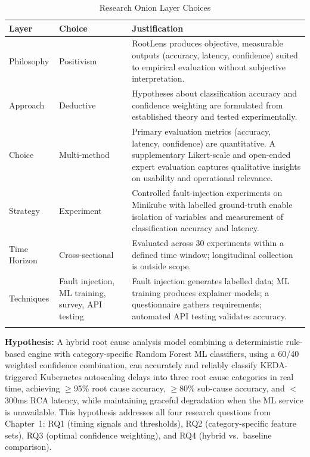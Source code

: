 \begin{xltabular}{\textwidth}{|p{2.5cm}|p{3.3cm}|X|}

\hline
\textbf{Layer} & \textbf{Choice} & \textbf{Justification} \\ \hline
\endfirsthead

Philosophy & Positivism & RootLens produces objective, measurable outputs (accuracy, latency, confidence) suited to empirical evaluation without subjective interpretation. \\ \hline

Approach & Deductive & Hypotheses about classification accuracy and confidence weighting are formulated from established theory and tested experimentally. \\ \hline

Choice & Multi-method & Primary evaluation metrics (accuracy, latency, confidence) are quantitative. A supplementary Likert-scale and open-ended expert evaluation captures qualitative insights on usability and operational relevance. \\ \hline

Strategy & Experiment & Controlled fault-injection experiments on Minikube with labelled ground-truth enable isolation of variables and measurement of classification accuracy and latency. \\ \hline

Time Horizon & Cross-sectional & Evaluated across 30 experiments within a defined time window; longitudinal collection is outside scope. \\ \hline

Techniques & Fault injection, ML training, survey, API testing & Fault injection generates labelled data; ML training produces explainer models; a questionnaire gathers requirements; automated API testing validates accuracy. \\ \hline

\caption{Research Onion Layer Choices}
\label{tab:research_onion}
\end{xltabular}

\textbf{Hypothesis:} A hybrid root cause analysis model combining a deterministic rule-based engine with category-specific Random Forest ML classifiers, using a 60/40 weighted confidence combination, can accurately and reliably classify KEDA-triggered Kubernetes autoscaling delays into three root cause categories in real time, achieving $\geq$95\% root cause accuracy, $\geq$80\% sub-cause accuracy, and $<$300ms RCA latency, while maintaining graceful degradation when the ML service is unavailable. This hypothesis addresses all four research questions from Chapter~1: RQ1 (timing signals and thresholds), RQ2 (category-specific feature sets), RQ3 (optimal confidence weighting), and RQ4 (hybrid vs.\ baseline comparison).

